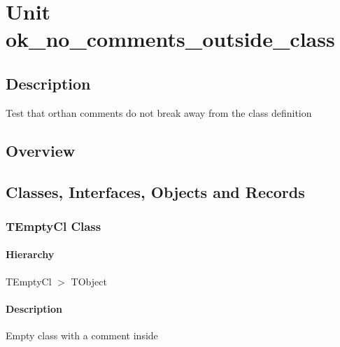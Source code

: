 \documentclass{report}
\newif\ifpdf
\begin{document}
\label{toc}\tableofcontents
\newpage
\newlength{\tmplength}
\chapter{Unit ok{\_}no{\_}comments{\_}outside{\_}class}
\label{ok_no_comments_outside_class}
\section{Description}
Test that orthan comments do not break away from the class definition
\section{Overview}
\begin{description}
\item[\texttt{\begin{ttfamily}TEmptyCl\end{ttfamily} Class}]
\item[\texttt{\begin{ttfamily}TEmptyRec\end{ttfamily} Record}]
\item[\texttt{\begin{ttfamily}TEmptyClWithNested\end{ttfamily} Class}]
\end{description}
\section{Classes, Interfaces, Objects and Records}
\ifpdf
\subsection*{\large{\textbf{TEmptyCl Class}}\normalsize\hspace{1ex}\hrulefill}
\else
\subsection*{TEmptyCl Class}
\fi
\label{ok_no_comments_outside_class.TEmptyCl}
\subsubsection*{\large{\textbf{Hierarchy}}\normalsize\hspace{1ex}\hfill}
TEmptyCl {$>$} TObject
\subsubsection*{\large{\textbf{Description}}\normalsize\hspace{1ex}\hfill}
Empty class with a comment inside\ifpdf
\end{document}
